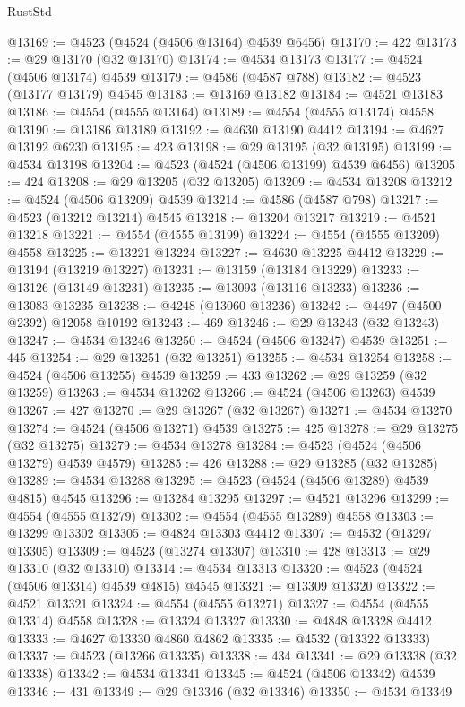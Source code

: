 \begin{lexlean}{RustStd}
\begin{coremodule}
@13169 := @4523 (@4524 (@4506 @13164) @4539 @6456)
@13170 := 422
@13173 := @29 @13170 (@32 @13170)
@13174 := @4534 @13173
@13177 := @4524 (@4506 @13174) @4539
@13179 := @4586 (@4587 @788)
@13182 := @4523 (@13177 @13179) @4545
@13183 := @13169 @13182
@13184 := @4521 @13183
@13186 := @4554 (@4555 @13164)
@13189 := @4554 (@4555 @13174) @4558
@13190 := @13186 @13189
@13192 := @4630 @13190 @4412
@13194 := @4627 @13192 @6230
@13195 := 423
@13198 := @29 @13195 (@32 @13195)
@13199 := @4534 @13198
@13204 := @4523 (@4524 (@4506 @13199) @4539 @6456)
@13205 := 424
@13208 := @29 @13205 (@32 @13205)
@13209 := @4534 @13208
@13212 := @4524 (@4506 @13209) @4539
@13214 := @4586 (@4587 @798)
@13217 := @4523 (@13212 @13214) @4545
@13218 := @13204 @13217
@13219 := @4521 @13218
@13221 := @4554 (@4555 @13199)
@13224 := @4554 (@4555 @13209) @4558
@13225 := @13221 @13224
@13227 := @4630 @13225 @4412
@13229 := @13194 (@13219 @13227)
@13231 := @13159 (@13184 @13229)
@13233 := @13126 (@13149 @13231)
@13235 := @13093 (@13116 @13233)
@13236 := @13083 @13235
@13238 := @4248 (@13060 @13236)
@13242 := @4497 (@4500 @2392) @12058 @10192
@13243 := 469
@13246 := @29 @13243 (@32 @13243)
@13247 := @4534 @13246
@13250 := @4524 (@4506 @13247) @4539
@13251 := 445
@13254 := @29 @13251 (@32 @13251)
@13255 := @4534 @13254
@13258 := @4524 (@4506 @13255) @4539
@13259 := 433
@13262 := @29 @13259 (@32 @13259)
@13263 := @4534 @13262
@13266 := @4524 (@4506 @13263) @4539
@13267 := 427
@13270 := @29 @13267 (@32 @13267)
@13271 := @4534 @13270
@13274 := @4524 (@4506 @13271) @4539
@13275 := 425
@13278 := @29 @13275 (@32 @13275)
@13279 := @4534 @13278
@13284 := @4523 (@4524 (@4506 @13279) @4539 @4579)
@13285 := 426
@13288 := @29 @13285 (@32 @13285)
@13289 := @4534 @13288
@13295 := @4523 (@4524 (@4506 @13289) @4539 @4815) @4545
@13296 := @13284 @13295
@13297 := @4521 @13296
@13299 := @4554 (@4555 @13279)
@13302 := @4554 (@4555 @13289) @4558
@13303 := @13299 @13302
@13305 := @4824 @13303 @4412
@13307 := @4532 (@13297 @13305)
@13309 := @4523 (@13274 @13307)
@13310 := 428
@13313 := @29 @13310 (@32 @13310)
@13314 := @4534 @13313
@13320 := @4523 (@4524 (@4506 @13314) @4539 @4815) @4545
@13321 := @13309 @13320
@13322 := @4521 @13321
@13324 := @4554 (@4555 @13271)
@13327 := @4554 (@4555 @13314) @4558
@13328 := @13324 @13327
@13330 := @4848 @13328 @4412
@13333 := @4627 @13330 @4860 @4862
@13335 := @4532 (@13322 @13333)
@13337 := @4523 (@13266 @13335)
@13338 := 434
@13341 := @29 @13338 (@32 @13338)
@13342 := @4534 @13341
@13345 := @4524 (@4506 @13342) @4539
@13346 := 431
@13349 := @29 @13346 (@32 @13346)
@13350 := @4534 @13349

\end{coremodule}
\end{lexlean}
